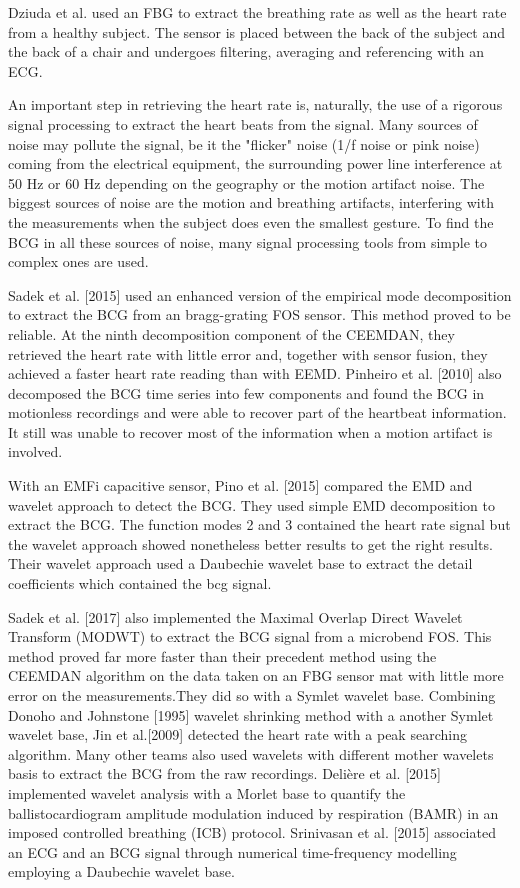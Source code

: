 \documentclass[twoside,twocolumn]{article}
\begin{document}
Dziuda et al. used  an FBG to extract the breathing rate as well as the heart rate from a healthy subject. The sensor is placed between the back of the subject and the back of a chair and undergoes filtering, averaging and referencing with an ECG.

An important step in retrieving the heart rate is, naturally, the use of a rigorous signal processing to extract the heart beats from the signal. Many sources of noise may pollute the signal, be it the "flicker" noise (1/f noise or pink noise) coming from the electrical equipment, the surrounding power line interference at 50 Hz or 60 Hz depending on the geography or the motion artifact noise. The biggest sources of noise are the motion and breathing artifacts, interfering with the measurements when the subject does even the smallest gesture. To find the BCG in all these sources of noise, many signal processing tools from simple to complex ones are used.

Sadek et al. [2015] used an enhanced version of the empirical mode decomposition to extract the BCG from an bragg-grating FOS sensor. This method proved to be reliable. At the ninth decomposition component of the CEEMDAN, they retrieved the heart rate with little error and, together with sensor fusion, they achieved a faster heart rate reading than with EEMD. Pinheiro et al. [2010] also decomposed the BCG time series into few components and found the BCG in motionless recordings and were able to recover part of the heartbeat information. It still was unable to recover most of the information when a motion artifact is involved.

With an EMFi capacitive sensor, Pino et al. [2015] compared the EMD and wavelet approach to detect the BCG. They used simple EMD decomposition to extract the BCG. The function modes 2 and 3 contained the heart rate signal but the wavelet approach showed nonetheless better results to get the right results. Their wavelet approach used a Daubechie wavelet base to extract the detail coefficients which contained the bcg signal.

Sadek et al. [2017] also implemented the Maximal Overlap Direct Wavelet Transform (MODWT) to extract the BCG signal from a microbend FOS. This method proved far more faster than their precedent method using the CEEMDAN algorithm on the data taken on an FBG sensor mat with little more error on the measurements.They did so with a Symlet wavelet base. Combining Donoho and Johnstone [1995] wavelet shrinking method with a another Symlet wavelet base, Jin et al.[2009] detected the heart rate with a peak searching algorithm. Many other teams also used wavelets with different mother wavelets basis to extract the BCG from the raw recordings. Delière et al. [2015] implemented wavelet analysis with a Morlet base to quantify the ballistocardiogram amplitude modulation induced by respiration (BAMR) in an imposed controlled breathing (ICB) protocol. Srinivasan et al. [2015] associated an ECG and an BCG signal through numerical time-frequency modelling employing a Daubechie wavelet base.

\newpage



 
\end{document}
